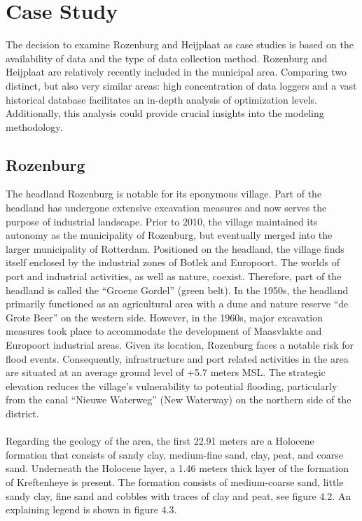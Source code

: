 \newpage
\section{Case Study}
The decision to examine Rozenburg and Heijplaat as case studies is based on the availability of data and the type of data collection method. Rozenburg and Heijplaat are relatively recently included in the municipal area. Comparing two distinct, but also very similar areas: high concentration of data loggers and a vast historical database facilitates an in-depth analysis of optimization levels. Additionally, this analysis could provide crucial insights into the modeling methodology.

\subsection{Rozenburg}
The headland Rozenburg is notable for its eponymous village. Part of the headland has undergone extensive excavation measures and now serves the purpose of industrial landscape. Prior to 2010, the village maintained its autonomy as the municipality of Rozenburg, but eventually merged into the larger municipality of Rotterdam. Positioned on the headland, the village finds itself enclosed by the industrial zones of Botlek and Europoort. The worlds of port and industrial activities, as well as nature, coexist. Therefore, part of the headland is called the “Groene Gordel” (green belt). In the 1950s, the headland primarily functioned as an agricultural area with a dune and nature reserve “de Grote Beer” on the western side. However, in the 1960s, major excavation measures took place to accommodate the development of Maasvlakte and Europoort industrial areas. Given its location, Rozenburg faces a notable risk for flood events. Consequently, infrastructure and port related activities in the area are situated at an average ground level of +5.7 meters MSL. The strategic elevation reduces the village’s vulnerability to potential flooding, particularly from the canal “Nieuwe Waterweg” (New Waterway) on the northern side of the district. \\
\\
Regarding the geology of the area, the first 22.91 meters are a Holocene formation that consists of sandy clay, medium-fine sand, clay, peat, and coarse sand. Underneath the Holocene layer, a 1.46 meters thick layer of the formation of Kreftenheye is present. The formation consists of medium-coarse sand, little sandy clay, fine sand and cobbles with traces of clay and peat, see figure 4.2. An explaining legend is shown in figure 4.3. \\

